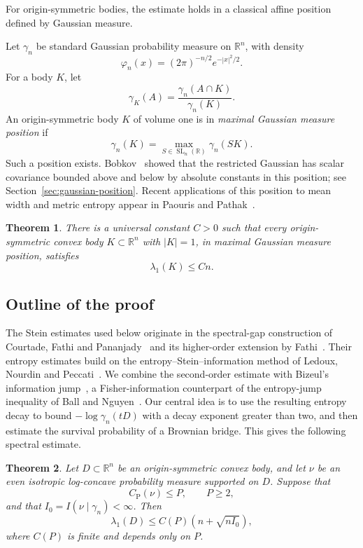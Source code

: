 \documentclass[11pt]{amsart}
\numberwithin{equation}{section}
\newtheorem{theorem}{Theorem}[section]
\theoremstyle{definition}
\theoremstyle{remark}
\newcommand{\R}{\mathbb R}
\newcommand{\gam}{\gamma_n}
\newcommand{\CP}{C_{\mathrm P}}
\DeclareMathOperator{\SL}{SL}
\begin{document}
For origin-symmetric bodies, the estimate holds in a classical affine
position defined by Gaussian measure.

Let \(\gam\) be standard Gaussian probability measure on \(\R^n\), with
density
\[
\varphi_n(x)=(2\pi)^{-n/2}e^{-|x|^2/2}.
\]
For a body \(K\), let
\[
\gamma_K(A)=\frac{\gam(A\cap K)}{\gam(K)}.
\]
An origin-symmetric body \(K\) of volume one is in
\emph{maximal Gaussian measure position} if
\[
\gam(K)=\max_{S\in\SL_n(\R)}\gam(SK).
\]
Such a position exists. Bobkov~\cite{Bob11} showed that the restricted
Gaussian has scalar covariance bounded above and below by absolute
constants in this position; see Section~\ref{sec:gaussian-position}.
Recent applications of this position to mean width and metric entropy
appear in Paouris and Pathak~\cite{PP26}.

\begin{theorem}\label{thm:gaussian-main}
There is a universal constant \(C>0\) such that every origin-symmetric
convex body \(K\subset\R^n\) with \(|K|=1\), in maximal Gaussian measure
position, satisfies
\[
\lambda_1(K)\le Cn.
\]
\end{theorem}

\subsection{Outline of the proof}

The Stein estimates used below originate in the spectral-gap
construction of Courtade, Fathi and Pananjady~\cite{CFP19} and its
higher-order extension by Fathi~\cite{Fathi21}. Their entropy estimates
build on the entropy--Stein--information method of Ledoux, Nourdin and
Peccati~\cite{LNP15}. We combine the second-order estimate with Bizeul's
information jump~\cite{Biz23}, a Fisher-information counterpart of the
entropy-jump inequality of Ball and Nguyen~\cite{BN12}.
Our central idea is to use the resulting entropy decay to bound
\(-\log\gam(tD)\) with a decay exponent greater than two, and then
estimate the survival probability of a Brownian bridge. This gives the
following spectral estimate.

\begin{theorem}\label{thm:information-spectrum}
Let \(D\subset\R^n\) be an origin-symmetric convex body, and let
\(\nu\) be an even isotropic log-concave probability measure supported
on \(D\). Suppose that
\[
\CP(\nu)\le P,\qquad P\ge2,
\]
and that \(I_0=I(\nu\mid\gam)<\infty\).
Then
\begin{equation}\label{eq:information-spectrum}
\lambda_1(D)\le C(P)\left(n+\sqrt{nI_0}\right),
\end{equation}
where \(C(P)\) is finite and depends only on \(P\).
\end{theorem}
\end{document}
